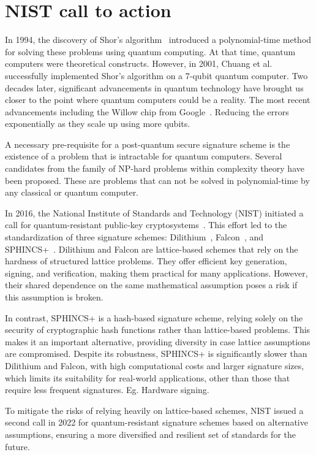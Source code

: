 \documentclass[11pt]{report}
\theoremstyle{definition}
\theoremstyle{plain}
\begin{document}
\section{NIST call to action}

In 1994, the discovery of Shor's algorithm~\cite{shor1997} introduced a polynomial-time method for solving these problems using quantum computing. At that time, quantum computers were theoretical constructs. However, in 2001, Chuang et al.~\cite{vandersypen2001experimental,buchmann2004post} successfully implemented Shor's algorithm on a 7-qubit quantum computer. Two decades later, significant advancements in quantum technology have brought us closer to the point where quantum computers could be a reality. The most recent advancements including the Willow chip from Google~\cite{blogMeetWillow}. Reducing the errors exponentially as they scale up using more qubits.

A necessary pre-requisite for a post-quantum secure signature scheme is the existence of a problem that is intractable for quantum computers. Several candidates from the family of NP-hard problems within complexity theory have been proposed. These are problems that can not be solved in polynomial-time by any classical or quantum computer.

In 2016, the National Institute of Standards and Technology (NIST) initiated a call for quantum-resistant public-key cryptosystems~\cite{nistcall}. This effort led to the standardization of three signature schemes: Dilithium~\cite{ducas2018crystals}, Falcon~\cite{fouque2018falcon}, and SPHINCS+~\cite{bernstein2019sphincs+}. Dilithium and Falcon are lattice-based schemes that rely on the hardness of structured lattice problems. They offer efficient key generation, signing, and verification, making them practical for many applications. However, their shared dependence on the same mathematical assumption poses a risk if this assumption is broken.

In contrast, SPHINCS+ is a hash-based signature scheme, relying solely on the security of cryptographic hash functions rather than lattice-based problems. This makes it an important alternative, providing diversity in case lattice assumptions are compromised. Despite its robustness, SPHINCS+ is significantly slower than Dilithium and Falcon, with high computational costs and larger signature sizes, which limits its suitability for real-world applications, other than those that require less frequent signatures. Eg. Hardware signing.

To mitigate the risks of relying heavily on lattice-based schemes, NIST issued a second call in 2022 for quantum-resistant signature schemes based on alternative assumptions, ensuring a more diversified and resilient set of standards for the future.
\end{document}
